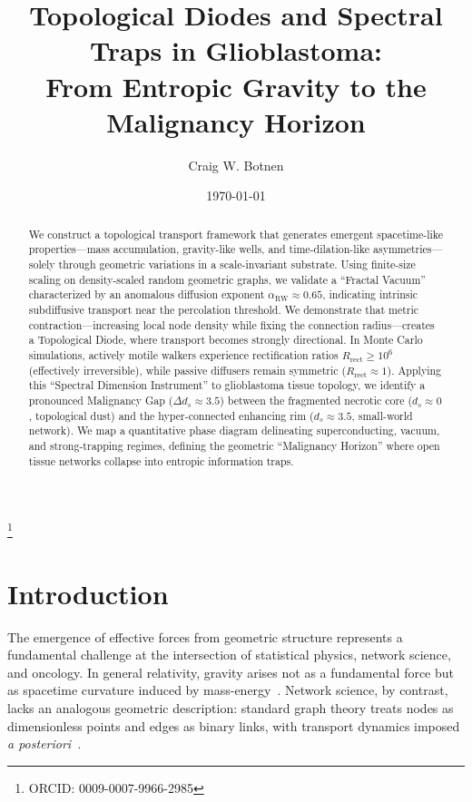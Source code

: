 \documentclass[aps,pre,twocolumn,superscriptaddress,10pt,floatfix]{revtex4-2}
\begin{document}
\title{Topological Diodes and Spectral Traps in Glioblastoma:\\
From Entropic Gravity to the Malignancy Horizon}

\author{Craig W. Botnen}
\thanks{ORCID: 0009-0007-9966-2985}

\date{\today}

\begin{abstract}
We construct a topological transport framework that generates emergent spacetime-like properties---mass accumulation, gravity-like wells, and time-dilation-like asymmetries---solely through geometric variations in a scale-invariant substrate. Using finite-size scaling on density-scaled random geometric graphs, we validate a ``Fractal Vacuum'' characterized by an anomalous diffusion exponent $\alpha_{\mathrm{RW}} \approx 0.65$, indicating intrinsic subdiffusive transport near the percolation threshold. We demonstrate that metric contraction---increasing local node density while fixing the connection radius---creates a Topological Diode, where transport becomes strongly directional. In Monte Carlo simulations, actively motile walkers experience rectification ratios $R_{\mathrm{rect}} \ge 10^{6}$ (effectively irreversible), while passive diffusers remain symmetric ($R_{\mathrm{rect}} \approx 1$). Applying this ``Spectral Dimension Instrument'' to glioblastoma tissue topology, we identify a pronounced Malignancy Gap ($\Delta d_s \approx 3.5$) between the fragmented necrotic core ($d_s \approx 0$, topological dust) and the hyper-connected enhancing rim ($d_s \approx 3.5$, small-world network). We map a quantitative phase diagram delineating superconducting, vacuum, and strong-trapping regimes, defining the geometric ``Malignancy Horizon'' where open tissue networks collapse into entropic information traps.
\end{abstract}

\maketitle

\section{Introduction}

The emergence of effective forces from geometric structure represents a fundamental challenge at the intersection of statistical physics, network science, and oncology. In general relativity, gravity arises not as a fundamental force but as spacetime curvature induced by mass-energy~\cite{einstein1916}. Network science, by contrast, lacks an analogous geometric description: standard graph theory treats nodes as dimensionless points and edges as binary links, with transport dynamics imposed \emph{a posteriori}~\cite{newman2003, barthelemy2011}.
\end{document}
